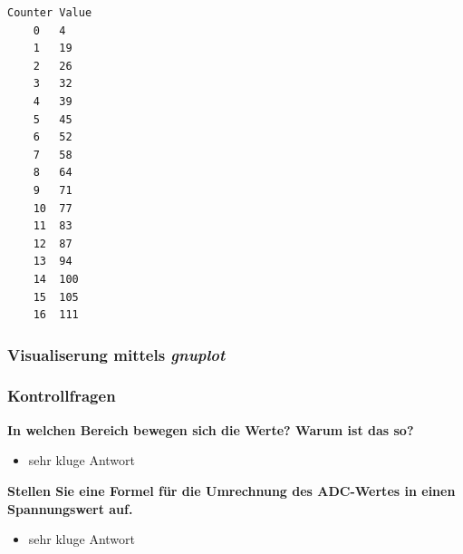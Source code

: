 \documentclass{article}
\begin{document}
\begin{lstlisting}
Counter Value
    0	4
    1	19
    2	26
    3	32
    4	39
    5	45
    6	52
    7	58
    8	64
    9	71
    10	77
    11	83
    12	87
    13	94
    14	100
    15	105
    16	111
\end{lstlisting}

\subsubsection{Visualiserung mittels \textit{gnuplot}}



\subsubsection{Kontrollfragen}

\textbf{In welchen Bereich bewegen sich die Werte? Warum ist das so?}
\begin{itemize}
    \item sehr kluge Antwort
\end{itemize}
\textbf{Stellen Sie eine Formel für die Umrechnung des ADC-Wertes in einen Spannungswert auf.}
\begin{itemize}
    \item sehr kluge Antwort
\end{itemize}


\newpage
\listoffigures

\listoftables
\end{document}
